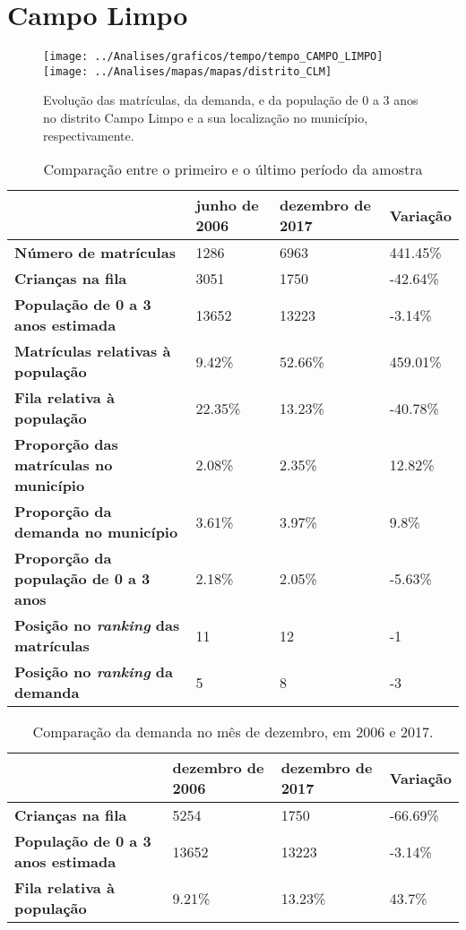 \section{Campo Limpo}
\begin{figure}[H]
	\centering
	\texttt{[image: ../Analises/graficos/tempo/tempo\_CAMPO\_LIMPO]}
	\texttt{[image: ../Analises/mapas/mapas/distrito\_CLM]}
	\caption{Evolução das matrículas, da demanda, e da população de 0 a 3 anos no distrito Campo Limpo e a sua localização no município, respectivamente.}
\end{figure}
\begin{table}[H]
	\begin{tabular}{|l|l|l|l|}
		\hline
		\textbf{}                                      & \textbf{junho de 2006}       & \textbf{dezembro de 2017}    & \textbf{Variação} \\ \hline
		\textbf{Número de matrículas}                  & 1286 & 6963 & 441.45\% \\ \hline
		\textbf{Crianças na fila}                      & 3051 & 1750 & -42.64\% \\ \hline
		\textbf{População de 0 a 3 anos estimada}      & 13652 & 13223 & -3.14\% \\ \hline
		\textbf{Matrículas relativas à população}      & 9.42\% & 52.66\% & 459.01\% \\ \hline
		\textbf{Fila relativa à população}             & 22.35\% & 13.23\% & -40.78\% \\ \hline
		\textbf{Proporção das matrículas no município} & 2.08\% & 2.35\% & 12.82\% \\ \hline
		\textbf{Proporção da demanda no município}     & 3.61\% & 3.97\% & 9.8\% \\ \hline
		\textbf{Proporção da população de 0 a 3 anos}  & 2.18\% & 2.05\% & -5.63\% \\ \hline
		\textbf{Posição no \textit{ranking} das matrículas}     & 11 & 12 & -1 \\ \hline
		\textbf{Posição no \textit{ranking} da demanda}         & 5 & 8 & -3 \\ \hline
	\end{tabular}
	\caption{Comparação entre o primeiro e o último período da amostra}
\end{table}
\begin{table}[H]
	\begin{tabular}{|l|l|l|l|}
		\hline
		\textbf{}                                 & \textbf{dezembro de 2006} & \textbf{dezembro de 2017} & \textbf{Variação} \\ \hline
		\textbf{Crianças na fila}                      & 5254 & 1750 & -66.69\% \\ \hline
		\textbf{População de 0 a 3 anos estimada}      & 13652 & 13223 & -3.14\% \\ \hline
		\textbf{Fila relativa à população}             & 9.21\% & 13.23\% & 43.7\% \\ \hline
	\end{tabular}
	\caption{Comparação da demanda no mês de dezembro, em 2006 e 2017.}
\end{table}

